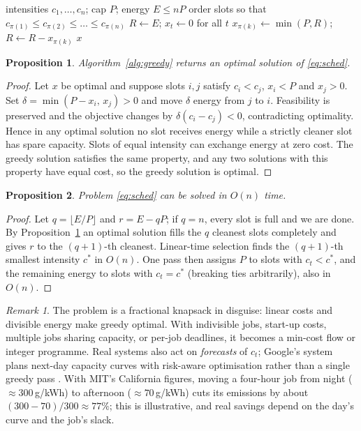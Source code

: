 \documentclass[11pt]{article}
\newtheorem{proposition}{Proposition}
\theoremstyle{definition}
\theoremstyle{remark}
\newtheorem*{remark}{Remark}
\begin{document}
\begin{algorithm}[h]
\caption{Greedy carbon-aware schedule}
\label{alg:greedy}
\begin{algorithmic}[1]
\Require intensities $c_1,\dots,c_n$; cap $P$; energy $E \le nP$
\State order slots so that $c_{\pi(1)} \le c_{\pi(2)} \le \dots \le c_{\pi(n)}$
\State $R \gets E$; \quad $x_t \gets 0$ for all $t$
  \State $x_{\pi(k)} \gets \min(P, R)$; \quad $R \gets R - x_{\pi(k)}$
\EndFor
\State \Return $x$
\end{algorithmic}
\end{algorithm}

\begin{proposition}\label{prop:greedy}
Algorithm~\ref{alg:greedy} returns an optimal solution of \eqref{eq:sched}.
\end{proposition}
\begin{proof}
Let $x$ be optimal and suppose slots $i,j$ satisfy $c_i < c_j$, $x_i < P$ and $x_j > 0$. Set $\delta = \min(P-x_i,\,x_j) > 0$ and move $\delta$ energy from $j$ to $i$. Feasibility is preserved and the objective changes by $\delta(c_i-c_j)<0$, contradicting optimality. Hence in any optimal solution no slot receives energy while a strictly cleaner slot has spare capacity. Slots of equal intensity can exchange energy at zero cost. The greedy solution satisfies the same property, and any two solutions with this property have equal cost, so the greedy solution is optimal.
\end{proof}

\begin{proposition}
Problem \eqref{eq:sched} can be solved in $O(n)$ time.
\end{proposition}
\begin{proof}
Let $q=\lfloor E/P\rfloor$ and $r = E - qP$; if $q=n$, every slot is full and we are done. By Proposition~\ref{prop:greedy} an optimal solution fills the $q$ cleanest slots completely and gives $r$ to the $(q{+}1)$-th cleanest. Linear-time selection \citep{clrs} finds the $(q{+}1)$-th smallest intensity $c^*$ in $O(n)$. One pass then assigns $P$ to slots with $c_t<c^*$, and the remaining energy to slots with $c_t=c^*$ (breaking ties arbitrarily), also in $O(n)$.
\end{proof}

\begin{remark}
The problem is a fractional knapsack in disguise: linear costs and divisible energy make greedy optimal. With indivisible jobs, start-up costs, multiple jobs sharing capacity, or per-job deadlines, it becomes a min-cost flow or integer programme. Real systems also act on \emph{forecasts} of $c_t$; Google's system plans next-day capacity curves with risk-aware optimisation rather than a single greedy pass \citep{radovanovic2023}. With MIT's California figures, moving a four-hour job from night ($\approx 300$\,g/kWh) to afternoon ($\approx 70$\,g/kWh) cuts its emissions by about $(300-70)/300 \approx 77\%$; this is illustrative, and real savings depend on the day's curve and the job's slack.
\end{remark}
\end{document}
